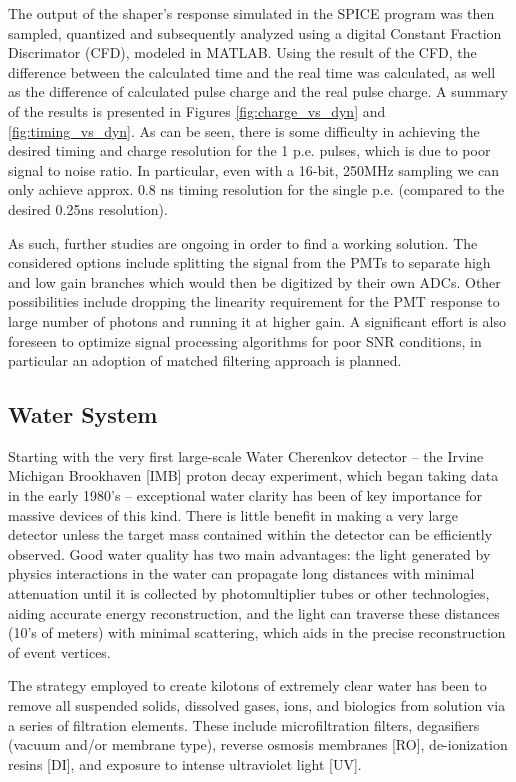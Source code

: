 The output of the shaper's response simulated in the SPICE   program was then sampled, quantized and subsequently analyzed using a digital Constant Fraction Discrimator (CFD), modeled in MATLAB.
Using the result of the CFD,
the difference between the calculated time and the real time was calculated, as well as the difference of calculated pulse charge and the real pulse charge.
A summary of the results is presented in Figures \ref{fig:charge_vs_dyn} and \ref{fig:timing_vs_dyn}.  As can be seen, there is some
difficulty in achieving the desired timing and charge resolution for the 1 p.e. pulses, which is due to poor signal to noise ratio. In particular, even with a 16-bit, 250MHz sampling we can only achieve approx. 0.8 ns timing resolution for the single p.e. (compared to the desired 0.25ns resolution).

As such, further studies are ongoing in order to find a working solution. The considered options include splitting the signal from the PMTs to separate high and low gain
branches which would then be digitized by their own ADCs. Other possibilities include dropping the linearity requirement for the PMT response to large number of photons and running it at higher gain. A significant effort is also foreseen to optimize signal processing algorithms for poor SNR conditions, in particular an adoption of matched filtering approach is planned.


\subsection{Water System}

Starting with the very first large-scale Water Cherenkov detector -- the
Irvine Michigan Brookhaven [IMB] proton decay experiment, which began
taking data in the early 1980's -- exceptional water clarity has been of
key importance for massive devices of this kind.  There is
little benefit in making a very large detector unless the target mass
contained within the detector can be efficiently observed.  Good water
quality has two main advantages: the light generated by physics
interactions in the water can propagate long distances with minimal
attenuation until it is collected by photomultiplier tubes or other
technologies, aiding accurate energy reconstruction, and the light can traverse
these distances (10's of meters) with minimal scattering, which aids
in the precise reconstruction of event vertices.

The strategy employed to create
kilotons of extremely clear water has been to remove all suspended solids,
dissolved gases, ions, and biologics from solution via a series of
filtration elements.  These include microfiltration filters, degasifiers
(vacuum and/or membrane type), reverse osmosis membranes [RO],
de-ionization resins [DI], and exposure to intense ultraviolet light [UV].

